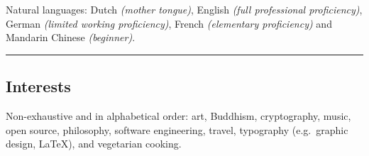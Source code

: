 \documentclass[10pt,a4paper]{article}
\newcommand*\acr[1]{\textscale{.85}{#1}}
\newenvironment{indentsection}[1]%
{\begin{list}{}%
  {\setlength{\leftmargin}{#1}}%
  \item[]%
}
{\end{list}}
\begin{document}
  \begin{indentsection}{\parindent}  %
  \begin{description*}
    \item[Natural languages:]
    Dutch \emph{(mother tongue)}, English \emph{(full professional proficiency)}, German \emph{(limited working proficiency)}, French \emph{(elementary proficiency)} and Mandarin Chinese \emph{(beginner)}.
  \end{description*}
  \end{indentsection}


\hrule \vspace{-0.4em} \subsection*{Interests}

  \begin{indentsection}{\parindent}
  \begin{description*}
    \item[Non-exhaustive and in alphabetical order:]
    art, Buddhism, cryptography, music, open source, philosophy, software engineering, travel, typography (e.g.\ graphic design, \LaTeX), \acr{UX} and vegetarian cooking.
  \end{description*}
  \end{indentsection}
\end{document}
